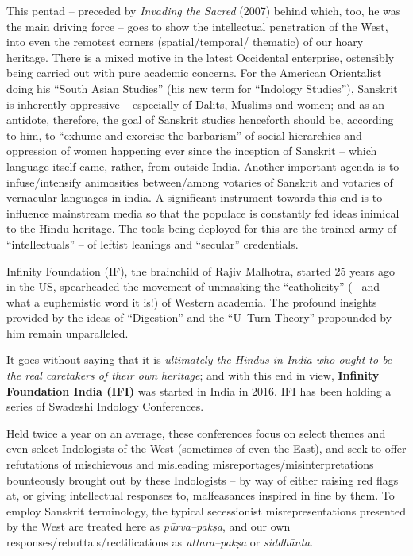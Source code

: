 This pentad – preceded by \textit{Invading the Sacred} (2007) behind which, too, he was the main driving force – goes to show the intellectual penetration of the West, into even the remotest corners (spatial/temporal/ thematic) of our hoary heritage. There is a mixed motive in the latest Occidental enterprise, ostensibly being carried out with pure academic concerns. For the American Orientalist doing his “South Asian Studies” (his new term for “Indology Studies”), Sanskrit is inherently oppressive – especially of Dalits, Muslims and women; and as an antidote, therefore, the goal of Sanskrit studies henceforth should be, according to him, to “exhume and exorcise the barbarism” of social hierarchies and oppression of women happening ever since the inception of Sanskrit – which language itself came, rather, from outside India. Another important agenda is to infuse/intensify animosities between/among votaries of Sanskrit and votaries of vernacular languages in india. A significant instrument towards this end is to influence mainstream media so that the populace is constantly fed ideas inimical to the Hindu heritage. The tools being deployed for this are the trained army of “intellectuals” – of leftist leanings and “secular” credentials.

Infinity Foundation (IF), the brainchild of Rajiv Malhotra, started 25 years ago in the US, spearheaded the movement of unmasking the “catholicity” (– and what a euphemistic word it is!) of Western academia. The profound insights provided by the ideas of “Digestion” and the “U–Turn Theory” propounded by him remain unparalleled.

It goes without saying that it is \textit{ultimately the Hindus in India who ought to be the real caretakers of their own heritage}; and with this end in view, \textbf{Infinity Foundation India (IFI)} was started in India in 2016. IFI has been holding a series of Swadeshi Indology Conferences. 

Held twice a year on an average, these conferences focus on select themes and even select Indologists of the West (sometimes of even the East), and seek to offer refutations of mischievous and misleading misreportages/misinterpretations bounteously brought out by these Indologists – by way of either raising red flags at, or giving intellectual responses to, malfeasances inspired in fine by them. To employ Sanskrit terminology, the typical secessionist misrepresentations presented by the West are treated here as \textit{pūrva–pakṣa}, and our own responses/rebuttals/rectifications as \textit{uttara–pakṣa} or \textit{siddhānta}. 

